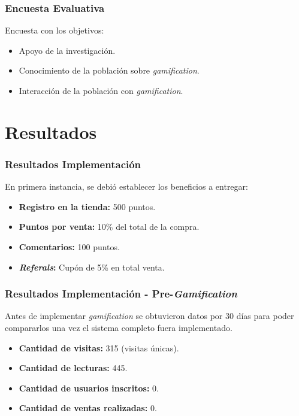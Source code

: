 \documentclass[10pt, compress]{beamer}
\begin{document}
\begin{frame}
 \frametitle{Encuesta Evaluativa}

Encuesta con los objetivos:

\begin{itemize}[<+- | alert@+>]
 \item Apoyo de la investigación.
 \item Conocimiento de la población sobre \emph{gamification}.
 \item Interacción de la población con \emph{gamification}.
\end{itemize}
\end{frame}

\section{Resultados}

\begin{frame}
 \frametitle{Resultados Implementación}

En primera instancia, se debió establecer los beneficios a entregar:

\begin{itemize}
\item \textbf{Registro en la tienda:} 500 puntos.
\item \textbf{Puntos por venta:} 10\% del total de la compra.
\item \textbf{Comentarios:} 100 puntos.
\item \textbf{\emph{Referals}:} Cupón de 5\% en total venta.
\end{itemize}
\end{frame}

\begin{frame}
 \frametitle{Resultados Implementación - Pre-\emph{Gamification}}

Antes de implementar \emph{gamification} se obtuvieron datos por $30$ días para poder
compararlos una vez el sistema completo fuera implementado.

\begin{itemize}
    \item \textbf{Cantidad de visitas:} 315 (visitas únicas).
    \item \textbf{Cantidad de lecturas:} 445.
    \item \textbf{Cantidad de usuarios inscritos:} 0.
    \item \textbf{Cantidad de ventas realizadas:} 0.
\end{itemize}

\end{frame}
\end{document}
